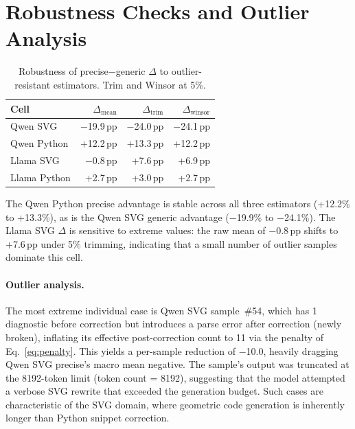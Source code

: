 \section{Robustness Checks and Outlier Analysis}
\label{app:robustness}

\begin{table}[h]
\centering
\small
\caption{Robustness of precise$-$generic $\Delta$ to outlier-resistant estimators. Trim and Winsor at 5\%.}
\label{tab:robustness}
\begin{tabular}{lrrr}
\toprule
Cell & $\Delta_\text{mean}$ & $\Delta_\text{trim}$ & $\Delta_\text{winsor}$ \\
\midrule
Qwen SVG & $-$19.9\,pp & $-$24.0\,pp & $-$24.1\,pp \\
Qwen Python & +12.2\,pp & +13.3\,pp & +12.2\,pp \\
Llama SVG & $-$0.8\,pp & +7.6\,pp & +6.9\,pp \\
Llama Python & +2.7\,pp & +3.0\,pp & +2.7\,pp \\
\bottomrule
\end{tabular}
\end{table}

The Qwen Python precise advantage is stable across all three estimators (+12.2\% to +13.3\%), as is the Qwen SVG generic advantage ($-$19.9\% to $-$24.1\%). The Llama SVG $\Delta$ is sensitive to extreme values: the raw mean of $-$0.8\,pp shifts to +7.6\,pp under 5\% trimming, indicating that a small number of outlier samples dominate this cell.

\paragraph{Outlier analysis.}
The most extreme individual case is Qwen SVG sample~\#54, which has 1 diagnostic before correction but introduces a parse error after correction (newly broken), inflating its effective post-correction count to 11 via the penalty of Eq.~\ref{eq:penalty}. This yields a per-sample reduction of $-$10.0, heavily dragging Qwen SVG precise's macro mean negative. The sample's output was truncated at the 8192-token limit (token count = 8192), suggesting that the model attempted a verbose SVG rewrite that exceeded the generation budget. Such cases are characteristic of the SVG domain, where geometric code generation is inherently longer than Python snippet correction.
